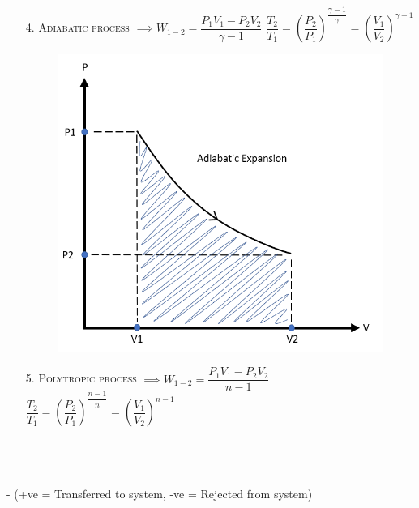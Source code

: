 \documentclass[8pt]{article}
\begin{document}
\begin{itemize}
\begin{figure}[H]
				\centering
			\end{figure}\hrulefill
		\item[4.] \textsc{Adiabatic process}  $\implies \boxed{W_{1-2} = \dfrac{P_1V_1-P_2V_2}{\gamma -1}}$ $\boxed{\dfrac{T_2}{T_1}=\left(\dfrac{P_2}{P_1}\right)^{\dfrac{\gamma -1}{\gamma}}=\left(\dfrac{V_1}{V_2}\right)^{\gamma -1}}$
			\begin{figure}[H]
				\includegraphics[scale=0.3]{adiabatic.png}
				\centering
			\end{figure}\hrulefill
		\item[5.] \textsc{Polytropic process}  $\implies \boxed{W_{1-2} = \dfrac{P_1V_1-P_2V_2}{n-1}}$ $\boxed{\dfrac{T_2}{T_1}=\left(\dfrac{P_2}{P_1}\right)^{\dfrac{n-1}{n}}=\left(\dfrac{V_1}{V_2}\right)^{n-1}}$
	\end{itemize}
	\hrulefill\\\\
\\ - (+ve = Transferred to system, -ve = Rejected from system)
\end{document}
